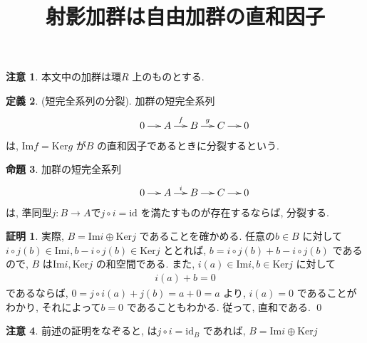 \documentclass[10pt, fleqn, label-section=none]{bxjsarticle}
\title{射影加群は自由加群の直和因子}
\date{}
\author{}
\theoremstyle{definition}
\newtheorem{dfn}{定義}[section]
\newtheorem{prop}[dfn]{命題}
\newtheorem*{pf*}{証明}
\newtheorem{remark}[dfn]{注意}
\newcommand{\Ker}{\textrm{Ker}}
\newcommand{\im}{\textrm{Im}}
\renewcommand{\;}{\, ; \,}
\begin{document}
\maketitle



\section{}

\subsection{}

\begin{remark}
本文中の加群は環$R$ 上のものとする. 
\end{remark}


\begin{dfn}(短完全系列の分裂). 加群の短完全系列
\begin{align*}  \xymatrix@C=13pt{
& 0 \ar[r] &A \ar[r]^f &B \ar[r]^g &C \ar[r] & 0
} \end{align*}
は,  $\textrm{Im} f = \textrm{Ker} g$ が$B$ の直和因子であるときに分裂するという. 
\end{dfn}


\begin{prop}加群の短完全系列
\begin{align*}  \xymatrix@C=13pt{
& 0 \ar[r] &A \ar[r] ^i &B  \ar[r] &C \ar[r] & 0
} \end{align*}
は, 準同型$j: B\rightarrow A$で$j \circ i =  \textrm{id}$ を満たすものが存在するならば, 分裂する. 

\end{prop}
\begin{pf*}
実際, $B = \im i \oplus \Ker j$ であることを確かめる. 任意の$b \in B$ に対して
$i\circ j (b)  \in \im i, b- i \circ j (b) \in \Ker j$ ととれば, $b = i \circ j (b) + b- i \circ j (b)$ であるので, $B$ は$\im i, \Ker j$ の和空間である. また, $i(a) \in \im i, b \in \Ker j$ に対して
\begin{align*} i (a) + b = 0\end{align*}
であるならば, $0 = j \circ i (a) + j(b) = a + 0 = a$ より, $i(a) = 0$ であることがわかり, それによって$b = 0$ であることもわかる. 従って, 直和である. 
\qed
\end{pf*}

\begin{remark}
前述の証明をなぞると,  は$j \circ i = \textrm{id}_B$ であれば, $B = \im i \oplus \Ker j$ 
\end{remark}
\end{document}
